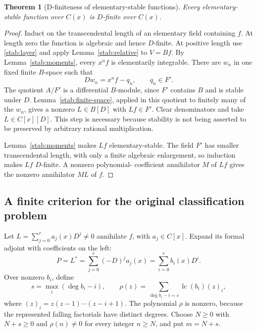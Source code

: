 \documentclass[11pt,a4paper]{article}
\newtheorem{theorem}{Theorem}[section]
\theoremstyle{definition}
\theoremstyle{remark}
\numberwithin{equation}{section}
\begin{document}
\begin{theorem}[D-finiteness of elementary-stable functions]
\label{stab:dfinite}
Every elementary-stable function over $C(x)$ is $D$-finite over $C(x)$.
\end{theorem}
\begin{proof}
Induct on the transcendental length of an elementary field containing
$f$.  At length zero the function is algebraic and hence $D$-finite.
At positive length use \eqref{stab:layer} and apply
Lemma~\ref{stab:relative} to $V=Bf$.  By Lemma~\ref{stab:moments},
every $x^nf$ is elementarily integrable.  There are $w_n$ in one fixed
finite $B$-space such that
\[
 Dw_n=x^nf-q_n,\qquad q_n\in F'.
\]
The quotient $A/F'$ is a differential $B$-module, since $F'$ contains
$B$ and is stable under $D$.  Lemma~\ref{stab:finite-space}, applied
in this quotient to finitely many of the $w_n$, gives a nonzero
$L\in B[D]$ with $Lf\in F'$.  Clear denominators and take
$L\in C[x][D]$.  This step is necessary because stability is not
being asserted to be preserved by arbitrary rational multiplication.

Lemma~\ref{stab:moments} makes $Lf$ elementary-stable.  The field
$F'$ has smaller transcendental length, with only a finite algebraic
enlargement, so induction makes $Lf$ $D$-finite.  A nonzero polynomial-
coefficient annihilator $M$ of $Lf$ gives the nonzero annihilator
$ML$ of $f$.
\end{proof}

\subsection{A finite criterion for the original classification problem}

Let $L=\sum_{j=0}^r a_j(x)D^j\ne0$ annihilate $f$, with
$a_j\in C[x]$.  Expand its formal adjoint with coefficients on the
left:
\[
 P=L^*=\sum_{j=0}^r(-D)^ja_j(x)=\sum_{i=0}^r b_i(x)D^i.
\]
Over nonzero $b_i$, define
\begin{equation}\label{stab:cutoff-data}
 s=\max_i(\deg b_i-i),\qquad
 \rho(z)=\sum_{\deg b_i-i=s}\operatorname{lc}(b_i)(z)_i,
\end{equation}
where $(z)_i=z(z-1)\cdots(z-i+1)$.  The polynomial $\rho$ is nonzero,
because the represented falling factorials have distinct degrees.
Choose $N\geq0$ with $N+s\geq0$ and $\rho(n)\ne0$ for every integer
$n\geq N$, and put $m=N+s$.
\end{document}
